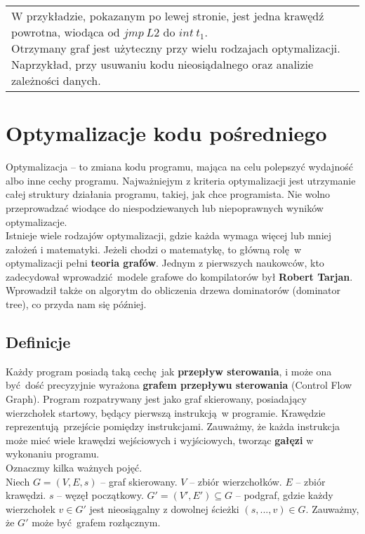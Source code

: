 \documentclass[leqno, 12pt]{article}
\begin{document}
\begin{center}
\begin{tabularx}{\textwidth}{ L{9cm} L{9cm} }
		W przykładzie, pokazanym po lewej stronie, jest jedna krawędź powrotna, wiodąca od $jmp \ L2$ do
		$int \ t_1$.
		$$$$ %
		Otrzymany graf jest użyteczny przy wielu rodzajach optymalizacji. Naprzykład, przy usuwaniu kodu nieosiądalnego
		oraz analizie zależności danych.

		\end{tabularx}
		\end{center}

	\section{Optymalizacje kodu pośredniego}
		
		Optymalizacja -- to zmiana kodu programu, mająca na celu polepszyć wydajność albo inne cechy
		programu. Najważniejym z kriteria optymalizacji jest utrzymanie całej struktury działania programu,
		takiej, jak chce programista. Nie wolno przeprowadzać wiodące do niespodziewanych lub
		niepoprawnych wyników optymalizacje.
		\\
		
		Istnieje wiele rodzajów optymalizacji, gdzie każda wymaga więcej lub mniej założeń i
		matematyki. Jeżeli chodzi o matematykę, to główną rolę w optymalizacji pełni \textbf{teoria grafów}.
		Jednym z pierwszych naukowców, kto zadecydował wprowadzić modele grafowe do kompilatorów był
		\textbf{Robert Tarjan}. Wprowadził także on algorytm do obliczenia drzewa dominatorów (dominator tree),
		co przyda nam się później.

		\subsection{Definicje}
			Każdy program posiadą taką cechę jak \textbf{przepływ sterowania}, i może ona być dość
			precyzyjnie wyrażona \textbf{grafem przepływu sterowania} (Control Flow Graph). Program
			rozpatrywany jest jako graf skierowany, posiadający wierzchołek startowy, będący pierwszą
			instrukcją w programie. Krawędzie reprezentują przejście pomiędzy instrukcjami. Zauważmy,
			że każda instrukcja może mieć wiele krawędzi wejściowych i wyjściowych, tworząc \textbf{gałęzi}
			w wykonaniu programu.
			\\
			
			Oznaczmy kilka ważnych pojęć.
			\\

			Niech $G = (V, E, s)$ -- graf skierowany.
			$V$ -- zbiór wierzchołków. $E$ -- zbiór krawędzi. $s$ -- węzęł początkowy.
			$G' = (V', E') \subseteq G$ -- podgraf, gdzie każdy wierzchołek $v \in G'$ jest nieosiągalny z
			dowolnej ścieżki $(s, ...,  v) \in G$. Zauważmy, że $G'$ może być grafem rozłącznym.
\end{document}
